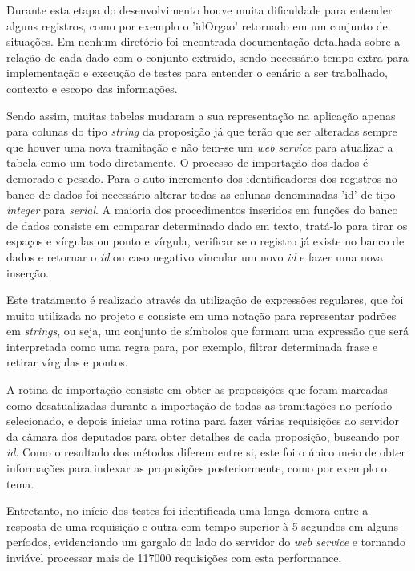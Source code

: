\documentclass[
	12pt,				%
	openright,			%
	twoside,			%
	a4paper,			%
	english,			%
	french,				%
	spanish,			%
	brazil				%
	]{abntex2}
\begin{document}
Durante esta etapa do desenvolvimento houve muita dificuldade para entender alguns registros, como por exemplo
o 'idOrgao' retornado em um conjunto de situações. Em nenhum diretório foi encontrada documentação detalhada sobre a 
relação de cada dado com o conjunto extraído, sendo necessário tempo extra para implementação e execução de testes para entender 
o cenário a ser trabalhado, contexto e escopo das informações.

Sendo assim, muitas tabelas mudaram a sua representação na aplicação apenas para colunas do tipo \emph{string} da proposição
já que terão que ser alteradas sempre que houver uma nova tramitação e não tem-se um \emph{web service} para atualizar a tabela como um 
todo diretamente. O processo de importação dos dados é demorado e pesado. Para o auto incremento dos identificadores dos registros
no banco de dados foi necessário alterar todas as colunas denominadas 'id' 
de tipo \emph{integer} para \emph{serial}. A maioria dos procedimentos inseridos em funções do banco de dados consiste em comparar determinado dado em texto, tratá-lo
para tirar os espaços e vírgulas ou ponto e vírgula, verificar se o registro já existe no banco de dados e retornar o \emph{id} ou caso negativo 
vincular um novo \emph{id} e fazer uma nova inserção.

Este tratamento é realizado através da utilização de expressões regulares, que foi muito utilizada no projeto e consiste em uma 
notação para representar padrões em \emph{strings}, ou seja, um conjunto de símbolos que formam uma expressão que será interpretada
como uma regra para, por exemplo, filtrar determinada frase e retirar vírgulas e pontos.

A rotina de importação consiste em obter as proposições que foram marcadas como desatualizadas durante a importação de todas as 
tramitações no período selecionado, e depois iniciar uma rotina para fazer várias requisições ao servidor da câmara dos deputados 
para obter detalhes de cada proposição, buscando por \emph{id}. Como o resultado dos métodos diferem entre si, este foi o único 
meio de obter informações para indexar as proposições posteriormente, como por exemplo o tema.

Entretanto, no início dos testes foi identificada uma longa demora entre a resposta de uma requisição e outra com tempo superior à 
5 segundos em alguns períodos, evidenciando um gargalo do lado do servidor do \emph{web service} e tornando inviável processar mais 
de 117000 requisições com esta performance. 
\end{document}
